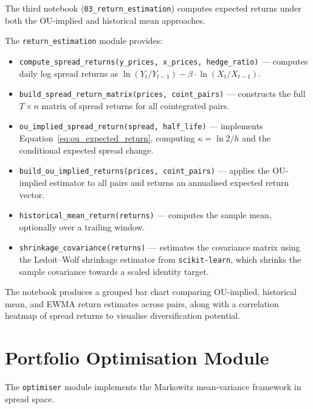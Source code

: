 \documentclass[a4paper]{report}
\begin{document}
The third notebook (\texttt{03\_return\_estimation}) computes expected returns under both the OU-implied and historical mean approaches.

The \texttt{return\_estimation} module provides:
\begin{itemize}
    \item \texttt{compute\_spread\_returns(y\_prices, x\_prices, hedge\_ratio)} --- computes daily log spread returns as $\ln(Y_t/Y_{t-1}) - \beta \cdot \ln(X_t/X_{t-1})$.
    \item \texttt{build\_spread\_return\_matrix(prices, coint\_pairs)} --- constructs the full $T \times n$ matrix of spread returns for all cointegrated pairs.
    \item \texttt{ou\_implied\_spread\_return(spread, half\_life)} --- implements Equation~\ref{eq:ou_expected_return}, computing $\kappa = \ln 2 / h$ and the conditional expected spread change.
    \item \texttt{build\_ou\_implied\_returns(prices, coint\_pairs)} --- applies the OU-implied estimator to all pairs and returns an annualised expected return vector.
    \item \texttt{historical\_mean\_return(returns)} --- computes the sample mean, optionally over a trailing window.
    \item \texttt{shrinkage\_covariance(returns)} --- estimates the covariance matrix using the Ledoit--Wolf shrinkage estimator from \texttt{scikit-learn}, which shrinks the sample covariance towards a scaled identity target.
\end{itemize}

The notebook produces a grouped bar chart comparing OU-implied, historical mean, and EWMA return estimates across pairs, along with a correlation heatmap of spread returns to visualise diversification potential.

\section{Portfolio Optimisation Module}

The \texttt{optimiser} module implements the Markowitz mean-variance framework in spread space.
\end{document}
